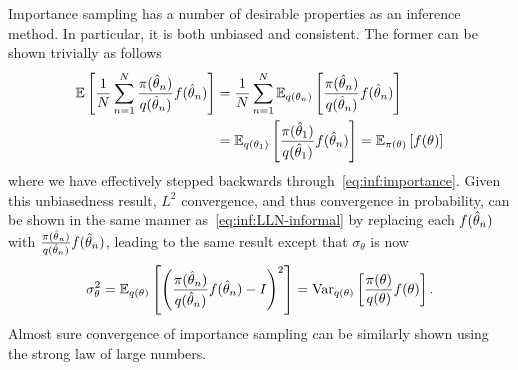 Importance sampling has a number of desirable properties as an inference method.
In particular, it is both unbiased and consistent.  The former can be shown trivially
as follows
\begin{align}
\mathbb{E} \left[\frac{1}{N} \sum_{n=1}^{N} \frac{\pi(\hat{\theta}_n)}{q(\hat{\theta}_n)} f(\hat{\theta}_n)\right] &=
\frac{1}{N} \sum_{n=1}^{N} \mathbb{E} _{q(\theta_n)}\left[\frac{\pi(\hat{\theta}_n)}{q(\hat{\theta}_n)} f(\hat{\theta}_n)\right] \nonumber \\
&=\mathbb{E} _{q(\theta_1)}\left[\frac{\pi(\hat{\theta}_1)}{q(\hat{\theta}_1)} f(\hat{\theta}_n)\right] =
\mathbb{E} _{\pi(\theta)}\left[f(\theta)\right]
\end{align}
where we have effectively stepped backwards through~\eqref{eq:inf:importance}.
Given this unbiasedness result, $L^2$ convergence, and thus convergence in probability,
can be shown in the same manner as~\eqref{eq:inf:LLN-informal} by replacing
each $f(\hat{\theta}_n)$ with $\frac{\pi(\hat{\theta}_n)}{q(\hat{\theta}_n)} f(\hat{\theta}_n)$, leading to the
same result except that $\sigma_{\theta}$ is now
\begin{align}
\label{eq:inf:sigma-imp}
\sigma_{\theta}^2 = \mathbb{E}_{q(\theta)} \left[\left(\frac{\pi(\hat{\theta}_n)}{q(\hat{\theta}_n)} f(\hat{\theta}_n)-I\right)^2\right]
= \mathrm{Var}_{q(\theta)} \left[\frac{\pi(\theta)}{q(\theta)} f(\theta)\right].
\end{align}
Almost sure convergence of importance sampling can be similarly shown using
the strong law of large numbers.


